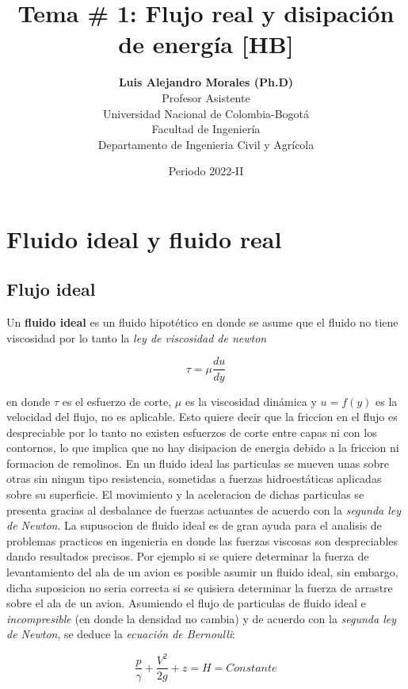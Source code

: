\documentclass[10pt, oneside]{article}
\title{Tema \# 1: Flujo real y disipaci\'on de energ\'ia [HB]}
\author{\textbf{Luis Alejandro Morales (Ph.D)}\\ \vspace{0.4cm} Profesor Asistente \\ Universidad Nacional de Colombia-Bogot\'a\\Facultad de Ingenier\'ia \\ Departamento de Ingenieria Civil y Agr\'icola}
\date{Periodo 2022-II}
\begin{document}
\maketitle
\tableofcontents


\section{Fluido ideal y fluido real}
\subsection{Flujo ideal}
Un \textbf{fluido ideal} es un fluido hipot\'etico en donde  se asume que el fluido no tiene viscosidad por lo tanto la \emph{ley de viscosidad de newton} 

\begin{equation}
\tau = \mu \frac{du}{dy}
\label{vis}
\end{equation}

en donde $\tau$ es el esfuerzo de corte, $\mu$ es la viscosidad din\'amica y $u=f(y)$ es la velocidad del flujo, no es aplicable. Esto quiere decir que la friccion en el flujo es despreciable por lo tanto  no existen esfuerzos de corte entre capas ni con los contornos, lo que implica que no hay disipacion de energia debido a la friccion ni formacion de remolinos. En un fluido ideal las particulas se mueven unas sobre otras sin ningun tipo resistencia, sometidas a fuerzas hidroest\'aticas aplicadas sobre su superficie. El movimiento y la aceleracion de dichas particulas se presenta gracias al desbalance de fuerzas actuantes de acuerdo con la \emph{segunda ley de Newton}. La supusocion de fluido ideal es de gran ayuda para el analisis de problemas practicos en ingenieria en donde las fuerzas viscosas son despreciables dando resultados precisos. Por ejemplo si se quiere determinar la fuerza de levantamiento del ala de un avion es posible asumir un fluido ideal, sin embargo, dicha suposicion no seria correcta si se quisiera determinar la fuerza de arrastre sobre el ala de un avion. Asumiendo el flujo de particulas de fluido ideal e \emph{incompresible} (en donde la densidad no cambia) y de acuerdo con la \emph{segunda ley de Newton}, se deduce la \emph{ecuaci\'on de Bernoulli}:

\begin{equation}
\frac{p}{\gamma} + \frac{V^2}{2g}+z = H = Constante
\end{equation}
\end{document}
